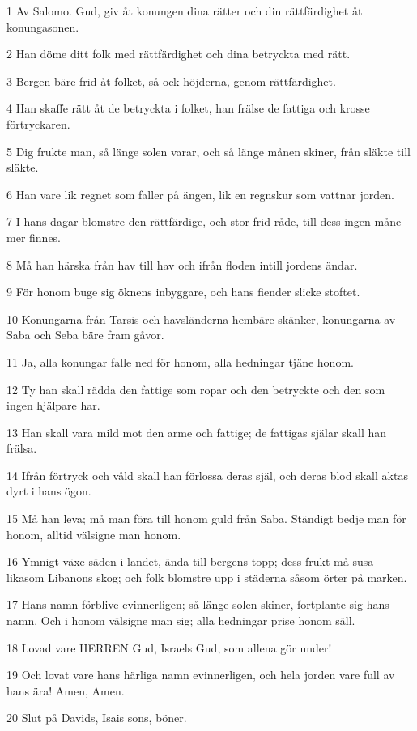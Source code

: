 \par 1 Av Salomo. Gud, giv åt konungen dina rätter och din rättfärdighet åt konungasonen.
\par 2 Han döme ditt folk med rättfärdighet och dina betryckta med rätt.
\par 3 Bergen bäre frid åt folket, så ock höjderna, genom rättfärdighet.
\par 4 Han skaffe rätt åt de betryckta i folket, han frälse de fattiga och krosse förtryckaren.
\par 5 Dig frukte man, så länge solen varar, och så länge månen skiner, från släkte till släkte.
\par 6 Han vare lik regnet som faller på ängen, lik en regnskur som vattnar jorden.
\par 7 I hans dagar blomstre den rättfärdige, och stor frid råde, till dess ingen måne mer finnes.
\par 8 Må han härska från hav till hav och ifrån floden intill jordens ändar.
\par 9 För honom buge sig öknens inbyggare, och hans fiender slicke stoftet.
\par 10 Konungarna från Tarsis och havsländerna hembäre skänker, konungarna av Saba och Seba bäre fram gåvor.
\par 11 Ja, alla konungar falle ned för honom, alla hedningar tjäne honom.
\par 12 Ty han skall rädda den fattige som ropar och den betryckte och den som ingen hjälpare har.
\par 13 Han skall vara mild mot den arme och fattige; de fattigas själar skall han frälsa.
\par 14 Ifrån förtryck och våld skall han förlossa deras själ, och deras blod skall aktas dyrt i hans ögon.
\par 15 Må han leva; må man föra till honom guld från Saba. Ständigt bedje man för honom, alltid välsigne man honom.
\par 16 Ymnigt växe säden i landet, ända till bergens topp; dess frukt må susa likasom Libanons skog; och folk blomstre upp i städerna såsom örter på marken.
\par 17 Hans namn förblive evinnerligen; så länge solen skiner, fortplante sig hans namn. Och i honom välsigne man sig; alla hedningar prise honom säll.
\par 18 Lovad vare HERREN Gud, Israels Gud, som allena gör under!
\par 19 Och lovat vare hans härliga namn evinnerligen, och hela jorden vare full av hans ära! Amen, Amen.
\par 20 Slut på Davids, Isais sons, böner.

